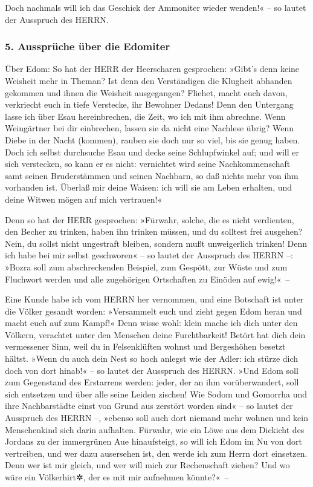 Doch nachmals will ich das Geschick der Ammoniter wieder
wenden!« -- so lautet der Ausspruch des HERRN.

\hypertarget{ausspruxfcche-uxfcber-die-edomiter}{%
\subsubsection{5. Aussprüche über die
Edomiter}\label{ausspruxfcche-uxfcber-die-edomiter}}

Über Edom: So hat der HERR der Heerscharen gesprochen:
»Gibt's denn keine Weisheit mehr in Theman? Ist denn den Verständigen
die Klugheit abhanden gekommen und ihnen die Weisheit ausgegangen?
Fliehet, macht euch davon, verkriecht euch in tiefe
Verstecke, ihr Bewohner Dedans! Denn den Untergang lasse ich über Esau
hereinbrechen, die Zeit, wo ich mit ihm abrechne. Wenn
Weingärtner bei dir einbrechen, lassen sie da nicht eine Nachlese übrig?
Wenn Diebe in der Nacht (kommen), rauben sie doch nur so viel, bis sie
genug haben. Doch ich selbst durchsuche Esau und decke
seine Schlupfwinkel auf; und will er sich verstecken, so kann er es
nicht: vernichtet wird seine Nachkommenschaft samt seinen Bruderstämmen
und seinen Nachbarn, so daß nichts mehr von ihm vorhanden ist.
Überlaß mir deine Waisen: ich will sie am Leben erhalten,
und deine Witwen mögen auf mich vertrauen!«

Denn so hat der HERR gesprochen: »Fürwahr, solche, die es
nicht verdienten, den Becher zu trinken, haben ihn trinken müssen, und
du solltest frei ausgehen? Nein, du sollst nicht ungestraft bleiben,
sondern mußt unweigerlich trinken! Denn ich habe bei mir
selbst geschworen« -- so lautet der Ausspruch des HERRN --: »Bozra soll
zum abschreckenden Beispiel, zum Gespött, zur Wüste und zum Fluchwort
werden und alle zugehörigen Ortschaften zu Einöden auf ewig!«~--

Eine Kunde habe ich vom HERRN her vernommen, und eine
Botschaft ist unter die Völker gesandt worden: »Versammelt euch und
zieht gegen Edom heran und macht euch auf zum Kampf!«
Denn wisse wohl: klein mache ich dich unter den Völkern,
verachtet unter den Menschen deine Furchtbarkeit! Betört
hat dich dein vermessener Sinn, weil du in Felsenklüften wohnst und
Bergeshöhen besetzt hältst. »Wenn du auch dein Nest so hoch anlegst wie
der Adler: ich stürze dich doch von dort hinab!« -- so lautet der
Ausspruch des HERRN. »Und Edom soll zum Gegenstand des
Erstarrens werden: jeder, der an ihm vorüberwandert, soll sich entsetzen
und über alle seine Leiden zischen! Wie Sodom und
Gomorrha und ihre Nachbarstädte einst von Grund aus zerstört worden
sind« -- so lautet der Ausspruch des HERRN --, »ebenso soll auch dort
niemand mehr wohnen und kein Menschenkind sich darin aufhalten.
Fürwahr, wie ein Löwe aus dem Dickicht des Jordans zu der
immergrünen Aue hinaufsteigt, so will ich Edom im Nu von dort
vertreiben, und wer dazu ausersehen ist, den werde ich zum Herrn dort
einsetzen. Denn wer ist mir gleich, und wer will mich zur Rechenschaft
ziehen? Und wo wäre ein Völkerhirt✲, der es mit mir aufnehmen
könnte?«~--

